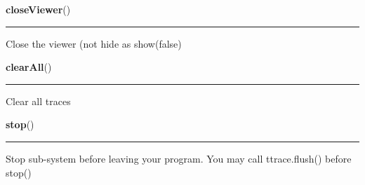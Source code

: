     \vspace{0.5ex}

\hspace{.8\funcindent}\begin{boxedminipage}{\funcwidth}

    \raggedright \textbf{closeViewer}()

    \vspace{-1.5ex}

    \rule{\textwidth}{0.5\fboxrule}
\setlength{\parskip}{2ex}
    Close the viewer (not hide as show(false)

\setlength{\parskip}{1ex}
    \end{boxedminipage}

    \label{tracetool:TTrace:clearAll}

    \vspace{0.5ex}

\hspace{.8\funcindent}\begin{boxedminipage}{\funcwidth}

    \raggedright \textbf{clearAll}()

    \vspace{-1.5ex}

    \rule{\textwidth}{0.5\fboxrule}
\setlength{\parskip}{2ex}
    Clear all traces

\setlength{\parskip}{1ex}
    \end{boxedminipage}

    \label{tracetool:TTrace:stop}

    \vspace{0.5ex}

\hspace{.8\funcindent}\begin{boxedminipage}{\funcwidth}

    \raggedright \textbf{stop}()

    \vspace{-1.5ex}

    \rule{\textwidth}{0.5\fboxrule}
\setlength{\parskip}{2ex}
    Stop sub-system before leaving your program. You may call 
    ttrace.flush() before stop()

\setlength{\parskip}{1ex}
    \end{boxedminipage}

